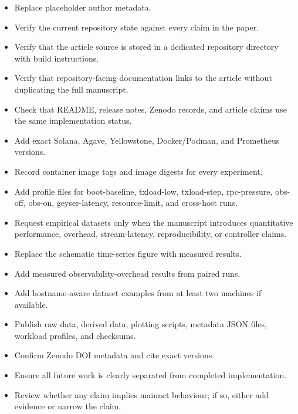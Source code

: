 \documentclass[11pt,a4paper]{article}
\begin{document}
\begin{itemize}
  \item Replace placeholder author metadata.
  \item Verify the current repository state against every claim in the paper.
  \item Verify that the article source is stored in a dedicated repository directory with build instructions.
  \item Verify that repository-facing documentation links to the article without duplicating the full manuscript.
  \item Check that README, release notes, Zenodo records, and article claims use the same implementation status.
  \item Add exact Solana, Agave, Yellowstone, Docker/Podman, and Prometheus versions.
  \item Record container image tags and image digests for every experiment.
  \item Add profile files for boot-baseline, txload-low, txload-step, rpc-pressure, obs-off, obs-on, geyser-latency, resource-limit, and cross-host runs.
  \item Request empirical datasets only when the manuscript introduces quantitative performance, overhead, stream-latency, reproducibility, or controller claims.
  \item Replace the schematic time-series figure with measured results.
  \item Add measured observability-overhead results from paired runs.
  \item Add hostname-aware dataset examples from at least two machines if available.
  \item Publish raw data, derived data, plotting scripts, metadata JSON files, workload profiles, and checksums.
  \item Confirm Zenodo DOI metadata and cite exact versions.
  \item Ensure all future work is clearly separated from completed implementation.
  \item Review whether any claim implies mainnet behaviour; if so, either add evidence or narrow the claim.
\end{itemize}



\end{document}
